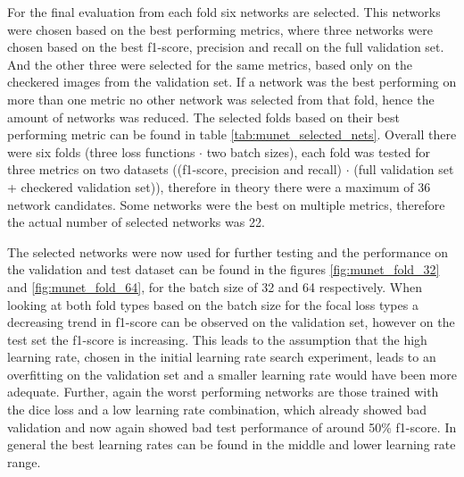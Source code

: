 For the final evaluation from each fold six networks are selected.
This networks were chosen based on the best performing metrics, where three networks were chosen based on the best f1-score, precision and recall on the full validation set.
And the other three were selected for the same metrics, based only on the checkered images from the validation set.
If a network was the best performing on more than one metric no other network was selected from that fold, hence the amount of networks was reduced.
The selected folds based on their best performing metric can be found in table \ref{tab:munet_selected_nets}.
Overall there were six folds (three loss functions $\cdot$ two batch sizes), each fold was tested for three metrics on two datasets ((f1-score, precision and recall) $\cdot$ (full validation set + checkered validation set)), therefore in theory there were a maximum of 36 network candidates.
Some networks were the best on multiple metrics, therefore the actual number of selected networks was 22.

The selected networks were now used for further testing and the performance on the validation and test dataset can be found in the figures \ref{fig:munet_fold_32} and \ref{fig:munet_fold_64}, for the batch size of 32 and 64 respectively.
When looking at both fold types based on the batch size for the focal loss types a decreasing trend in f1-score can be observed on the validation set, however on the test set the f1-score is increasing.
This leads to the assumption that the high learning rate, chosen in the initial learning rate search experiment, leads to an overfitting on the validation set and a smaller learning rate would have been more adequate.
Further, again the worst performing networks are those trained with the dice loss and a low learning rate combination, which already showed bad validation and now again showed bad test performance of around 50\% f1-score.
In general the best learning rates can be found in the middle and lower learning rate range.


